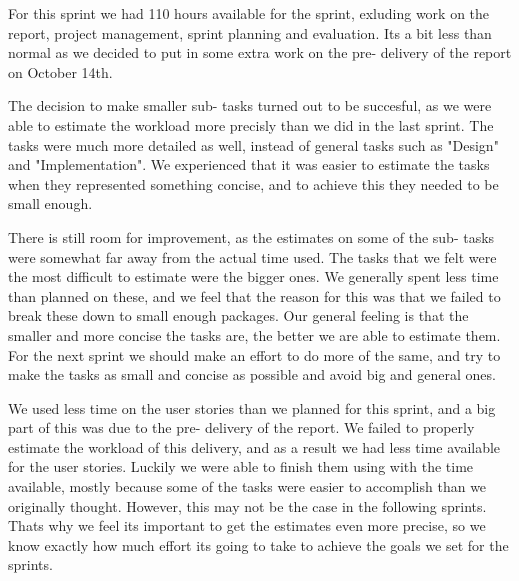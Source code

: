For this sprint we had 110 hours available for the sprint, exluding work on the report, project management, sprint planning and evaluation. Its a bit less than normal as we decided to put in some extra work on the pre- delivery of the report on October 14th.
\newline

The decision to make smaller sub- tasks turned out to be succesful, as we were able to estimate the workload more precisly than we did in the last sprint. The tasks were much more detailed as well, instead of general tasks such as "Design" and "Implementation". We experienced that it was easier to estimate the tasks when they represented something concise, and to achieve this they needed to be small enough.

There is still room for improvement, as the estimates on some of the sub- tasks were somewhat far away from the actual time used. The tasks that we felt were the most difficult to estimate were the bigger ones. We generally spent less time than planned on these, and we feel that the reason for this was that we failed to break these down to small enough packages. Our general feeling is that the smaller and more concise the tasks are, the better we are able to estimate them. For the next sprint we should make an effort to do more of the same, and try to make the tasks as small and concise as possible and avoid big and general ones.

We used less time on the user stories than we planned for this sprint, and a big part of this was due to the pre- delivery of the report. We failed to properly estimate the workload of this delivery, and as a result we had less time available for the user stories. Luckily we were able to finish them using with the time available, mostly because some of the tasks were easier to accomplish than we originally thought. However, this may not be the case in the following sprints. Thats why we feel its important to get the estimates even more precise, so we know exactly how much effort its going to take to achieve the goals we set for the sprints. 

